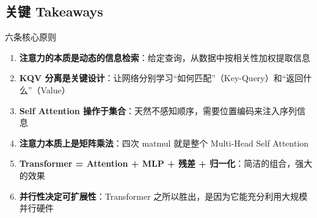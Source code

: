 \subsection{关键 Takeaways}

\begin{importantbox}{六条核心原则}
\begin{enumerate}
    \item \textbf{注意力的本质是动态的信息检索}：给定查询，从数据中按相关性加权提取信息
    \item \textbf{KQV 分离是关键设计}：让网络分别学习``如何匹配''（Key-Query）和``返回什么''（Value）
    \item \textbf{Self Attention 操作于集合}：天然不感知顺序，需要位置编码来注入序列信息
    \item \textbf{注意力本质上是矩阵乘法}：四次 matmul 就是整个 Multi-Head Self Attention
    \item \textbf{Transformer = Attention + MLP + 残差 + 归一化}：简洁的组合，强大的效果
    \item \textbf{并行性决定可扩展性}：Transformer 之所以胜出，是因为它能充分利用大规模并行硬件
\end{enumerate}
\end{importantbox}


